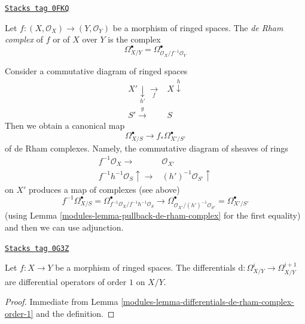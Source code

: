 \begin{definition}
\label{modules-definition-de-rham-complex-morphism-ringed-spaces}
\href{https://stacks.math.columbia.edu/tag/0FKQ}{\texttt{Stacks tag 0FKQ}}

Let $f : (X, \mathcal{O}_X) \to (Y, \mathcal{O}_Y)$ be a morphism
of ringed spaces. The {\it de Rham complex} of $f$ or of $X$ over $Y$
is the complex
$$
\Omega^\bullet_{X/Y} = \Omega^\bullet_{\mathcal{O}_X/f^{-1}\mathcal{O}_Y}
$$
\end{definition}

Consider a commutative diagram of ringed spaces
$$
\begin{array}{cc}X' \underset{h'}{\downarrow}\underset{f}{\longrightarrow} & X \overset{h}{\downarrow} \\ S' \overset{g}{\longrightarrow} & S\end{array}
$$
Then we obtain a canonical map
$$
\Omega^\bullet_{X/S} \to f_*\Omega^\bullet_{X'/S'}
$$
of de Rham complexes. Namely, the commutative diagram
of sheaves of rings
$$
\begin{array}{cc}f^{-1}\mathcal{O}_X \longrightarrow & \mathcal{O}_{X'} \\ f^{-1}h^{-1}\mathcal{O}_S \uparrow\longrightarrow & (h')^{-1}\mathcal{O}_{S'} \uparrow\end{array}
$$
on $X'$ produces a map of complexes (see above)
$$
f^{-1}\Omega^\bullet_{X/S} =
\Omega^\bullet_{f^{-1}\mathcal{O}_X/f^{-1}h^{-1}\mathcal{O}_S}
\longrightarrow
\Omega^\bullet_{\mathcal{O}_{X'}/(h')^{-1}\mathcal{O}_{S'}} =
\Omega^\bullet_{X'/S'}
$$
(using Lemma \ref{modules-lemma-pullback-de-rham-complex} for the first equality)
and then we can use adjunction.

\begin{lemma}
\label{modules-lemma-differentials-relative-de-rham-complex-order-1}
\href{https://stacks.math.columbia.edu/tag/0G3Z}{\texttt{Stacks tag 0G3Z}}

Let $f : X \to Y$ be a morphism of ringed spaces. The differentials
$\text{d} : \Omega^i_{X/Y}  \to \Omega^{i + 1}_{X/Y}$
are differential operators of order $1$ on $X/Y$.
\end{lemma}

\begin{proof}

Immediate from Lemma \ref{modules-lemma-differentials-de-rham-complex-order-1}
and the definition.
\end{proof}

